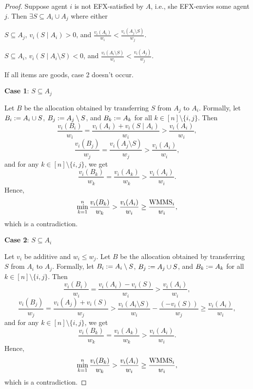 \begin{proof}
Suppose agent $i$ is not EFX-satisfied by $A$, i.e., she EFX-envies some agent $j$.
Then $\exists S \subseteq A_i \cup A_j$ where either

\begin{tightenum}
\item $S \subseteq A_j$, $v_i(S \mid A_i) > 0$, and
    $\displaystyle \frac{v_i(A_i)}{w_i} < \frac{v_i(A_j \setminus S)}{w_j}$.
\item $S \subseteq A_i$, $v_i(S \mid A_i \setminus S) < 0$, and
    $\displaystyle \frac{v_i(A_i \setminus S)}{w_i} < \frac{v_i(A_j)}{w_j}$.
\end{tightenum}

If all items are goods, case 2 doesn't occur.

\textbf{Case 1}: $S \subseteq A_j$

Let $B$ be the allocation obtained by transferring $S$ from $A_j$ to $A_i$.
Formally, let $B_i := A_i \cup S$, $B_j := A_j \setminus S$,
and $B_k := A_k$ for all $k \in [n] \setminus \{i, j\}$. Then
\[ \frac{v_i(B_i)}{w_i} = \frac{v_i(A_i) + v_i(S \mid A_i)}{w_i} > \frac{v_i(A_i)}{w_i}, \]
\[ \frac{v_i(B_j)}{w_j} = \frac{v_i(A_j \setminus S)}{w_j} > \frac{v_i(A_i)}{w_i}, \]
and for any $k \in [n] \setminus \{i, j\}$, we get
\[ \frac{v_i(B_k)}{w_k} = \frac{v_i(A_k)}{w_k} > \frac{v_i(A_i)}{w_i}. \]
Hence,
\[ \min_{k=1}^n \frac{v_i(B_k)}{w_k} > \frac{v_i(A_i)}{w_i} \ge \frac{\mathrm{WMMS}_i}{w_i}, \]
which is a contradiction.

\textbf{Case 2}: $S \subseteq A_i$

Let $v_i$ be additive and $w_i \le w_j$.
Let $B$ be the allocation obtained by transferring $S$ from $A_i$ to $A_j$. Formally,
let $B_i := A_i \setminus S$, $B_j := A_j \cup S$,
and $B_k := A_k$ for all $k \in [n] \setminus \{i, j\}$. Then
\[ \frac{v_i(B_i)}{w_i} = \frac{v_i(A_i) - v_i(S)}{w_i} > \frac{v_i(A_i)}{w_i}, \]
\[ \frac{v_i(B_j)}{w_j} = \frac{v_i(A_j) + v_i(S)}{w_j} > \frac{v_i(A_i \setminus S)}{w_i} - \frac{(-v_i(S))}{w_j} \ge \frac{v_i(A_i)}{w_i}, \]
and for any $k \in [n] \setminus \{i, j\}$, we get
\[ \frac{v_i(B_k)}{w_k} = \frac{v_i(A_k)}{w_k} > \frac{v_i(A_i)}{w_i}. \]
Hence,
\[ \min_{k=1}^n \frac{v_i(B_k)}{w_k} > \frac{v_i(A_i)}{w_i} \ge \frac{\mathrm{WMMS}_i}{w_i}, \]
which is a contradiction.
\end{proof}

